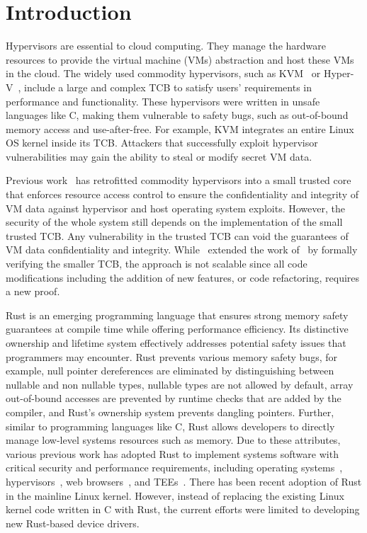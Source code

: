 
\chapter{Introduction}

Hypervisors are essential to cloud computing. They manage the hardware
resources to provide the virtual machine (VMs) abstraction and host
these VMs in the cloud.
The widely used commodity
hypervisors, such as KVM~\cite{kivity07kvm} or Hyper-V~\cite{hyperv},
include a large and complex TCB to satisfy users' requirements in
performance and functionality. These hypervisors were written in unsafe
languages like C, making them vulnerable to safety bugs, such as
out-of-bound memory access and use-after-free. For example, KVM
integrates an entire Linux OS kernel inside its TCB. Attackers that
successfully exploit hypervisor vulnerabilities may gain the ability
to steal or modify secret VM data.

Previous work~\cite{hypsec} has retrofitted commodity hypervisors into a small
trusted core that enforces resource access control to ensure the
confidentiality and integrity of VM data against hypervisor and host operating
system exploits. However, the security of the whole system still depends on the
implementation of the small trusted TCB. Any vulnerability in the trusted TCB
can void the guarantees of VM data confidentiality and integrity.
While~\cite{sekvm} extended the work of~\cite{hypsec} by formally verifying the
smaller TCB, the approach is not scalable since all code modifications
including the addition of new features, or code refactoring, requires a new
proof.

Rust is an emerging programming language that ensures strong memory safety
guarantees at compile time while offering performance efficiency.
Its distinctive ownership and lifetime system
effectively addresses potential safety issues that programmers may encounter.
Rust prevents various memory safety bugs, for example, null pointer
dereferences are eliminated by distinguishing between nullable and non
nullable types, nullable types are not allowed by default, array out-of-bound
accesses are prevented by runtime checks that are added by the compiler, and
Rust's ownership system prevents dangling pointers.
Further, similar to programming languages like C, Rust allows developers to
directly manage low-level systems resources such as memory. Due to these
attributes, various previous work has adopted Rust to implement systems
software with critical security and performance requirements, including
operating systems~\cite{NrOS, Redleaf, TockOS, theseus},
hypervisors~\cite{DuVisor, RustyHermit}, web browsers~\cite{servo},
and TEEs~\cite{rustsgx,rustee}.
There has been recent adoption of Rust in the mainline Linux kernel. However,
instead of replacing the existing Linux kernel code written in C with Rust,
the current efforts were limited to developing new Rust-based device drivers.

